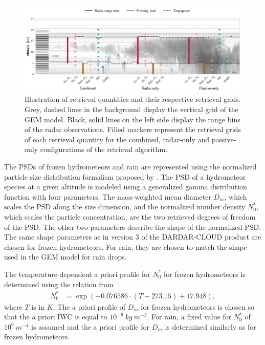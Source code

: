 \documentclass[journal abbreviation, manuscript]{copernicus}
\begin{document}
\begin{figure}
\centering \includegraphics[width = 1.0\linewidth]{../plots/retrieval_sketch}
\caption{Illustration of retrieval quantities and their respective retrieval
  grids. Grey, dashed lines in the background display the vertical grid of the
  GEM model. Black, solid lines on the left side display the range bins of the
  radar observations. Filled markers represent the retrieval grids of each
  retrieval quantity for the combined, radar-only and passive-only
  configurations of the retrieval algorithm.}
\label{fig:retrieval_sketch}
\end{figure}

The PSDs of frozen hydrometeors and rain are represented using the normalized
particle size distribution formalism proposed by \cite{delanoe05}. The PSD of a
hydrometeor species at a given altitude is modeled using a generalized gamma
distribution function with four parameters. The mass-weighted mean diameter
$D_m$, which scales the PSD along the size dimension, and the normalized number
density $N_0^*$, which scales the particle concentration, are the two retrieved
degrees of freedom of the PSD. The other two parameters describe the shape of
the normalized PSD. The same shape parameters as in version 3 of the
DARDAR-CLOUD product \citep{cazenave18} are chosen for frozen hydrometeors. For
rain, they are chosen to match the shape used in the GEM model for rain drops.


The temperature-dependent a priori profile for $N_0^*$ for frozen hydrometeors
is determined using the relation from \cite{delanoe14}
%
\begin{align}
N_0^* &= \exp \left ( -0.076586 \cdot (T - 273.15) + 17.948 \right ),
\end{align}
%
where $T$ is in $\unit{K}$. The a priori profile of $D_m$ for frozen
hydrometeors is chosen so that the a priori IWC is equal to
$10^{-6}\ \unit{kg\ m^{-3}}$. For rain, a fixed value for $N_0^*$ of
$10^6\ \unit{m^{-4}}$ is assumed and the a priori profile for $D_m$ is
determined similarly as for frozen hydrometeors.
\end{document}
